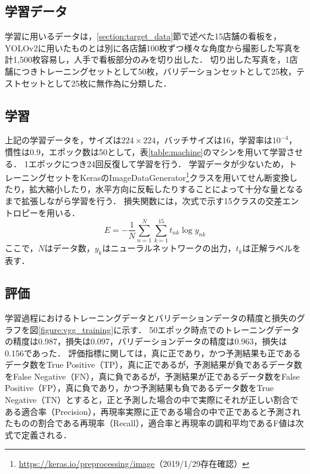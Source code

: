   \subsection{学習データ}
    学習に用いるデータは，\ref{section:target_data}節で述べた15店舗の看板を，YOLOv2に用いたものとは別に各店舗100枚ずつ様々な角度から撮影した写真を計1,500枚容易し，人手で看板部分のみを切り出した．
    切り出した写真を，1店舗につきトレーニングセットとして50枚，バリデーションセットとして25枚，テストセットとして25枚に無作為に分類した．
    
  \subsection{学習}
    上記の学習データを，サイズは$224 \times 224$，バッチサイズは16，学習率は$10^{-4}$，慣性は0.9，エポック数は50として，表\ref{table:machine}のマシンを用いて学習させる．
    1エポックにつき24回反復して学習を行う．
    学習データが少ないため，トレーニングセットをKerasのImageDataGenerator\footnote{\url{https://keras.io/preprocessing/image}（2019/1/29存在確認）}クラスを用いてせん断変換したり，拡大縮小したり，水平方向に反転したりすることによって十分な量となるまで拡張しながら学習を行う．
    損失関数には，次式で示す15クラスの交差エントロピーを用いる．
    \begin{equation}
      E = -\frac{1}{N} \sum_{n=1}^{N} \sum_{k=1}^{15} t_{nk} \log y_{nk}
    \end{equation}
    ここで，$N$はデータ数，$y_k$はニューラルネットワークの出力，$t_k$は正解ラベルを表す．

  \subsection{評価}
    学習過程におけるトレーニングデータとバリデーションデータの精度と損失のグラフを図\ref{figure:vgg_training}に示す．
    50エポック時点でのトレーニングデータの精度は0.987，損失は0.097，バリデーションデータの精度は0.963，損失は0.156であった．
    評価指標に関しては，真に正であり，かつ予測結果も正であるデータ数をTrue Positive（TP），真に正であるが，予測結果が負であるデータ数をFalse Negative（FN），真に負であるが，予測結果が正であるデータ数をFalse Positive（FP），真に負であり，かつ予測結果も負であるデータ数をTrue Negative（TN）とすると，正と予測した場合の中で実際にそれが正しい割合である適合率（Precision），再現率実際に正である場合の中で正であると予測されたものの割合である再現率（Recall），適合率と再現率の調和平均であるF値は次式で定義される\cite{Richert:2013}．


